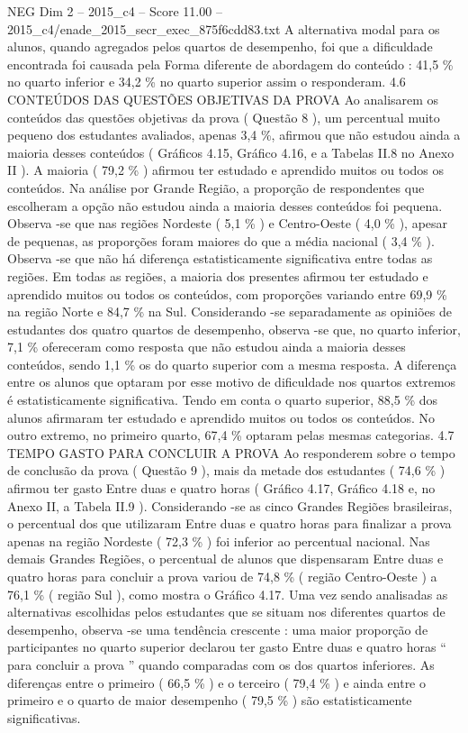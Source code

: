 \begin{textsample}{NEG Dim 2 – 2015\_c4 – Score 11.00 – 2015\_c4/enade\_2015\_secr\_exec\_875f6cdd83.txt}
A alternativa modal para os alunos, quando agregados pelos quartos de desempenho, foi que a dificuldade encontrada foi causada pela Forma diferente de abordagem do conteúdo : 41,5 \% no quarto inferior e 34,2 \% no quarto superior assim o responderam. 4.6 CONTEÚDOS DAS QUESTÕES OBJETIVAS DA PROVA Ao analisarem os conteúdos das questões objetivas da prova ( Questão 8 ), um percentual muito pequeno dos estudantes avaliados, apenas 3,4 \%, afirmou que não estudou ainda a maioria desses conteúdos ( Gráficos 4.15, Gráfico 4.16, e a Tabelas II.8 no Anexo II ).
A maioria ( 79,2 \% ) afirmou ter estudado e aprendido muitos ou todos os conteúdos.
Na análise por Grande Região, a proporção de respondentes que escolheram a opção não estudou ainda a maioria desses conteúdos foi pequena.
Observa -se que nas regiões Nordeste ( 5,1 \% ) e Centro-Oeste ( 4,0 \% ), apesar de pequenas, as proporções foram maiores do que a média nacional ( 3,4 \% ).
Observa -se que não há diferença estatisticamente significativa entre todas as regiões.
Em todas as regiões, a maioria dos presentes afirmou ter estudado e aprendido muitos ou todos os conteúdos, com proporções variando entre 69,9 \% na região Norte e 84,7 \% na Sul.
Considerando -se separadamente as opiniões de estudantes dos quatro quartos de desempenho, observa -se que, no quarto inferior, 7,1 \% ofereceram como resposta que não estudou ainda a maioria desses conteúdos, sendo 1,1 \% os do quarto superior com a mesma resposta.
A diferença entre os alunos que optaram por esse motivo de dificuldade nos quartos extremos é estatisticamente significativa.
Tendo em conta o quarto superior, 88,5 \% dos alunos afirmaram ter estudado e aprendido muitos ou todos os conteúdos.
No outro extremo, no primeiro quarto, 67,4 \% optaram pelas mesmas categorias. 4.7 TEMPO GASTO PARA CONCLUIR A PROVA Ao responderem sobre o tempo de conclusão da prova ( Questão 9 ), mais da metade dos estudantes ( 74,6 \% ) afirmou ter gasto Entre duas e quatro horas ( Gráfico 4.17, Gráfico 4.18 e, no Anexo II, a Tabela II.9 ).
Considerando -se as cinco Grandes Regiões brasileiras, o percentual dos que utilizaram Entre duas e quatro horas para finalizar a prova apenas na região Nordeste ( 72,3 \% ) foi inferior ao percentual nacional.
Nas demais Grandes Regiões, o percentual de alunos que dispensaram Entre duas e quatro horas para concluir a prova variou de 74,8 \% ( região Centro-Oeste ) a 76,1 \% ( região Sul ), como mostra o Gráfico 4.17.
Uma vez sendo analisadas as alternativas escolhidas pelos estudantes que se situam nos diferentes quartos de desempenho, observa -se uma tendência crescente : uma maior proporção de participantes no quarto superior declarou ter gasto Entre duas e quatro horas “ para concluir a prova ” quando comparadas com os dos quartos inferiores.
As diferenças entre o primeiro ( 66,5 \% ) e o terceiro ( 79,4 \% ) e ainda entre o primeiro e o quarto de maior desempenho ( 79,5 \% ) são estatisticamente significativas.

\end{textsample}
